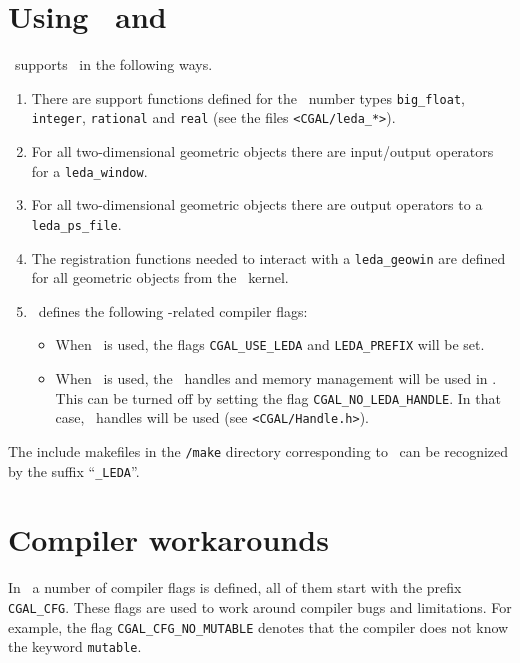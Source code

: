 \lcTex{\begin{appendix}}

\section{Using \cgal\ and \leda}\label{sec:leda}
\cgal\ supports \leda\ in the following ways.

\begin{enumerate}
\item There are support functions defined for the \leda\ number types
  \texttt{big\_float}, \texttt{integer}, \texttt{rational} and
  \texttt{real} (see the files \texttt{<CGAL/leda\_*>}).
\item For all two-dimensional geometric objects there are input/output
  operators for a \texttt{leda\_window}.
\item For all two-dimensional geometric objects there are output
  operators to a \texttt{leda\_ps\_file}.
\item The registration functions needed to interact with a
  \texttt{leda\_geowin} are defined for all geometric objects from the
  \cgal\ kernel.
\item \cgal\ defines the following \leda-related compiler flags:
\begin{itemize}
\item When \leda\ is used, the flags \texttt{CGAL\_USE\_LEDA} and
  \texttt{LEDA\_PREFIX} will be set.
\item When \leda\ is used, the \leda\ handles and memory management
  will be used in \cgal.  This can be turned off by setting the flag
  \texttt{CGAL\_NO\_LEDA\_HANDLE}. In that case, \cgal\ handles will
  be used (see \texttt{<CGAL/Handle.h>}).
\end{itemize}
\end{enumerate}

The include makefiles in the \texttt{\cgaldir/make} directory
corresponding to \leda\ can be recognized by the suffix
``\texttt{\_LEDA}''.

\section{Compiler workarounds}

In \cgal\ a number of compiler flags is defined, all of them start
with the prefix \texttt{CGAL\_CFG}. These flags are used to work
around compiler bugs and limitations.  For example, the flag
\texttt{CGAL\_CFG\_NO\_MUTABLE} denotes that the compiler does not
know the keyword \texttt{mutable}. 

